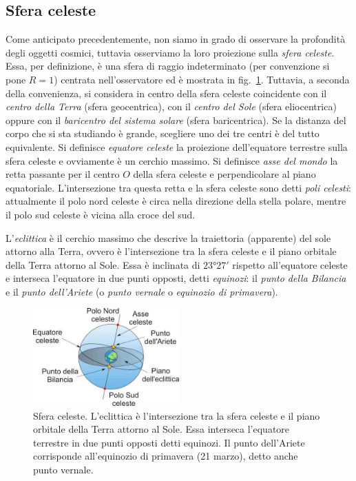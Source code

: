 \subsection{Sfera celeste}\label{sec:posizione-sfera-celeste}
Come anticipato precedentemente, non siamo in grado di osservare la profondità degli oggetti cosmici, tuttavia osserviamo la loro proiezione sulla \emph{sfera celeste}. Essa, per definizione, è una sfera di raggio indeterminato (per convenzione si pone $R=1$) centrata nell'osservatore ed è mostrata in fig.~\ref{fig:sfera-celeste}. Tuttavia, a seconda della convenienza, si considera in centro della sfera celeste coincidente con il \emph{centro della Terra} (sfera geocentrica), con il \emph{centro del Sole} (sfera eliocentrica) oppure con il \emph{baricentro del sistema solare} (sfera baricentrica). Se la distanza del corpo che si sta studiando è grande, scegliere uno dei tre centri è del tutto equivalente. Si definisce \emph{equatore celeste} la proiezione dell'equatore terrestre sulla sfera celeste e ovviamente è un cerchio massimo. Si definisce \emph{asse del mondo} la retta passante per il centro $O$ della sfera celeste e perpendicolare al piano equatoriale. L'intersezione tra questa retta e la sfera celeste sono detti \emph{poli celesti}: attualmente il polo nord celeste è circa nella direzione della stella polare, mentre il polo sud celeste è vicina alla croce del sud. 

L'\emph{eclittica} è il cerchio massimo che descrive la traiettoria (apparente) del sole attorno alla Terra, ovvero è l'intersezione tra la sfera celeste e il piano orbitale della Terra attorno al Sole. Essa è inclinata di $\ang{23;27;}$ rispetto all'equatore celeste e interseca l'equatore in due punti opposti, detti \emph{equinozi}: il \emph{punto della Bilancia} e il \emph{punto dell'Ariete} (o \emph{punto vernale} o \emph{equinozio di primavera}).

\begin{figure}
\centering
\includegraphics[width=0.5\textwidth]{immagini/sfera-celeste.jpg}
\caption{Sfera celeste. L'eclittica è l'intersezione tra la sfera celeste e il piano orbitale della Terra attorno al Sole. Essa interseca l'equatore terrestre in due punti opposti detti equinozi. Il punto dell'Ariete corrisponde all'equinozio di primavera (21 marzo), detto anche punto vernale.}
\label{fig:sfera-celeste}
\end{figure}


